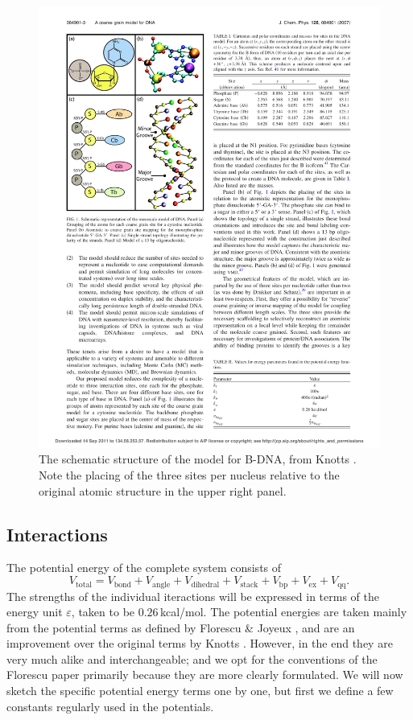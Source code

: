 \begin{figure}[h]
\begin{center}
\includegraphics{schematic_structure_knotts}
\caption{The schematic structure of the model for B-DNA, from Knotts \etal \cite{knotts2007coarse}. Note the placing of the three sites per nucleus relative to the original atomic structure in the upper right panel.}
\label{schematic_knotts}
\end{center}
\end{figure}




\subsection{Interactions}

The potential energy of the complete system consists of
\begin{equation}
V_\text{total} = V_\text{bond} + V_\text{angle} + V_\text{dihedral} + V_\text{stack} + V_\text{bp} + V_\text{ex} + V_\text{qq}.
\end{equation}
The strengths of the individual iteractions will be expressed in terms of the energy unit $\varepsilon$, taken to be $0.26$\,kcal/mol. The potential energies are taken mainly from the potential terms as defined by Florescu \& Joyeux \cite{florescu2011thermal}, and are an improvement over the original terms by Knotts \etal \cite{knotts2007coarse}. However, in the end they are very much alike and interchangeable; and we opt for the conventions of the Florescu paper primarily because they are more clearly formulated. We will now sketch the specific potential energy terms one by one, but first we define a few constants regularly used in the potentials.

